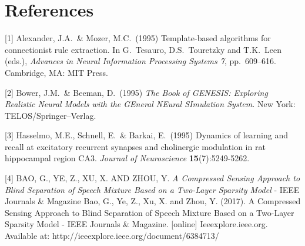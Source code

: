 \documentclass{article}
\begin{document}
\section*{References}

\medskip

\small

[1] Alexander, J.A.\ \& Mozer, M.C.\ (1995) Template-based algorithms
for connectionist rule extraction. In G.\ Tesauro, D.S.\ Touretzky and
T.K.\ Leen (eds.), {\it Advances in Neural Information Processing
  Systems 7}, pp.\ 609--616. Cambridge, MA: MIT Press.

[2] Bower, J.M.\ \& Beeman, D.\ (1995) {\it The Book of GENESIS:
  Exploring Realistic Neural Models with the GEneral NEural SImulation
  System.}  New York: TELOS/Springer--Verlag.

[3] Hasselmo, M.E., Schnell, E.\ \& Barkai, E.\ (1995) Dynamics of
learning and recall at excitatory recurrent synapses and cholinergic
modulation in rat hippocampal region CA3. {\it Journal of
  Neuroscience} {\bf 15}(7):5249-5262.

[4] BAO, G., YE, Z., XU, X. AND ZHOU, Y.
{\it A Compressed Sensing Approach to Blind Separation of Speech Mixture Based on a Two-Layer Sparsity Model} - IEEE Journals \& Magazine Bao, G., Ye, Z., Xu, X. and Zhou, Y. (2017). A Compressed Sensing Approach to Blind Separation of Speech Mixture Based on a Two-Layer Sparsity Model - IEEE Journals \& Magazine. [online] Ieeexplore.ieee.org. Available at: http://ieeexplore.ieee.org/document/6384713/
\end{document}
